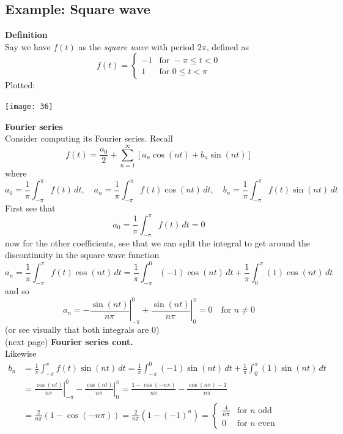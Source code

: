 \documentclass{report}
\begin{document}
\subsection{Example: Square wave}
\textbf{Definition}\\
Say we have $f(t)$ as the \textit{square wave} with period $2\pi$, defined as
\begin{equation*}
f(t)=\begin{cases}
-1&\text{for }-\pi\leq t<0\\
1&\text{for }0\leq t<\pi
\end{cases}
\end{equation*}
Plotted:
\begin{center}
\texttt{[image: 36]}\\
\end{center}
\textbf{Fourier series}\\
Consider computing its Fourier series. Recall
\begin{equation*}
f(t)=\frac{a_0}{2}+\sum^{\infty}_{n=1}[a_n\cos(nt)+b_n\sin(nt)]
\end{equation*}
where
\begin{equation*}
a_0=\frac{1}{\pi}\int^\pi_{-\pi}f(t)\,dt,\quad
a_n=\frac{1}{\pi}\int^\pi_{-\pi}f(t)\cos(nt)\,dt,\quad
b_n=\frac{1}{\pi}\int^\pi_{-\pi}f(t)\sin(nt)\,dt
\end{equation*}
First see that
\begin{equation*}
a_0=\frac{1}{\pi}\int^\pi_{-\pi}f(t)\,dt=0
\end{equation*}
now for the other coefficients, see that we can split the
integral to get around the discontinuity in the 
square wave function
\begin{equation*}
a_n=\frac{1}{\pi}\int^\pi_{-\pi}f(t)\cos(nt)\,dt
=\frac{1}{\pi}\int^0_{-\pi}(-1)\cos(nt)\,dt+\frac{1}{\pi}\int^\pi_{0}(1)\cos(nt)\,dt
\end{equation*}
and so
\begin{equation*}
a_n=\left.-\frac{\sin(nt)}{n\pi}\right|_{-\pi}^0+
\left.\frac{\sin(nt)}{n\pi}\right|^{\pi}_0=0\quad\text{for $n\neq0$}
\end{equation*}
(or see visually that both integrals are 0)\\
(next page)
\newpage
\noindent\textbf{Fourier series cont.}\\
Likewise
\begin{align*}
b_n&=\frac{1}{\pi}\int^\pi_{-\pi}f(t)\sin(nt)\,dt=
\frac{1}{\pi}\int^0_{-\pi}(-1)\sin(nt)\,dt+\frac{1}{\pi}\int^\pi_{0}(1)\sin(nt)\,dt\\
&=\left.\frac{\cos(nt)}{n\pi}\right|_{-\pi}^0-\left.\frac{\cos(nt)}{n\pi}\right|^{\pi}_0
=\frac{1-\cos(-n\pi)}{n\pi}-\frac{\cos(n\pi)-1}{n\pi}\\
&=\frac{2}{n\pi}(1-\cos(-n\pi))=\frac{2}{n\pi}(1-(-1)^n)
=\begin{cases}
\frac{4}{n\pi}&\text{for $n$ odd}\\
0&\text{for $n$ even}
\end{cases}
\end{align*}
\end{document}
